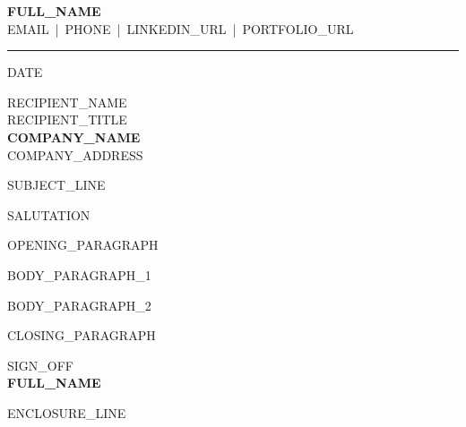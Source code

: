 \documentclass[a4paper,10pt]{article}
\begin{document}
\begin{flushleft}
  {\Huge \textbf{{{FULL_NAME}}}}\\[3pt]
  {\small {{EMAIL}} \,|\, {{PHONE}} \,|\, {{LINKEDIN_URL}} \,|\, {{PORTFOLIO_URL}}}
\end{flushleft}
\textcolor{gray}{\rule{\textwidth}{1pt}}

\vspace{1em}
{{DATE}}

\vspace{0.5em}
{{RECIPIENT_NAME}} \\
{{RECIPIENT_TITLE}} \\
\textbf{{{COMPANY_NAME}}} \\
{{COMPANY_ADDRESS}}

\vspace{1em}
{{SUBJECT_LINE}}

\vspace{1em}
{{SALUTATION}}

{{OPENING_PARAGRAPH}}

{{BODY_PARAGRAPH_1}}

{{BODY_PARAGRAPH_2}}

{{CLOSING_PARAGRAPH}}

\vspace{1.5em}
{{SIGN_OFF}}\\[2em]
\textbf{{{FULL_NAME}}}

\vspace{2em}
{{ENCLOSURE_LINE}}
\end{document}
